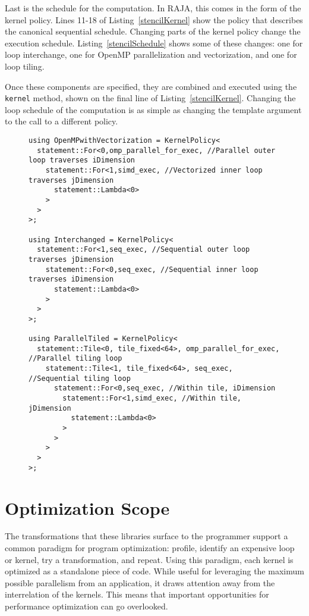 Last is the schedule for the computation.
In RAJA, this comes in the form of the kernel policy.
Lines 11-18 of Listing~\ref{stencilKernel} show the policy that describes the canonical sequential schedule.
Changing parts of the kernel policy change the execution schedule. 
Listing~\ref{stencilSchedule} shows some of these changes: one for loop interchange, one for OpenMP parallelization and vectorization, and one for loop tiling.

Once these components are specified, they are combined and executed using the \verb.kernel. method, shown on the final line of Listing~\ref{stencilKernel}.
Changing the loop schedule of the computation is as simple as changing the template argument to the call to a different policy.


\begin{figure}
\begin{lstlisting}[caption={Kernel policies for different loop schedules.}, label={stencilSchedule}]
using OpenMPwithVectorization = KernelPolicy<
  statement::For<0,omp_parallel_for_exec, //Parallel outer loop traverses iDimension
    statement::For<1,simd_exec, //Vectorized inner loop traverses jDimension
      statement::Lambda<0>
    >
  >
>;

using Interchanged = KernelPolicy<
  statement::For<1,seq_exec, //Sequential outer loop traverses jDimension
    statement::For<0,seq_exec, //Sequential inner loop traverses iDimension
      statement::Lambda<0>
    >
  >
>;

using ParallelTiled = KernelPolicy<
  statement::Tile<0, tile_fixed<64>, omp_parallel_for_exec, //Parallel tiling loop
    statement::Tile<1, tile_fixed<64>, seq_exec, //Sequential tiling loop
      statement::For<0,seq_exec, //Within tile, iDimension
        statement::For<1,simd_exec, //Within tile, jDimension
          statement::Lambda<0>
        >
      >
    >
  >
>;
\end{lstlisting}
\end{figure}

\section{Optimization Scope}

The transformations that these libraries surface to the programmer support a common paradigm for program optimization: profile, identify an expensive loop or kernel, try a transformation, and repeat.
Using this paradigm, each kernel is optimized as a standalone piece of code.
While useful for leveraging the maximum possible parallelism from an application, it draws attention away from the interrelation of the kernels.
This means that important opportunities for performance optimization can go overlooked.

